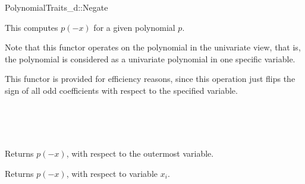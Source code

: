 \begin{ccRefConcept}{PolynomialTraits_d::Negate}
\ccDefinition

This  computes $p(-x)$ for a given polynomial $p$. 

Note that this functor operates on the polynomial in the univariate view, that is, 
the polynomial is considered as a univariate polynomial in one specific variable. 

This functor is provided for efficiency reasons, since this operation just flips the sign 
of all odd coefficients with respect to the specified variable.  

\ccRefines 
{}\\
\\
\\

\ccTypes
{}
\ccGlue
{}

\ccOperations
{}
         { Returns $p(-x)$, with respect to the outermost variable. }

         { Returns $p(-x)$, with respect to variable $x_i$. 
         }


\ccSeeAlso

\\
\\

\end{ccRefConcept}
